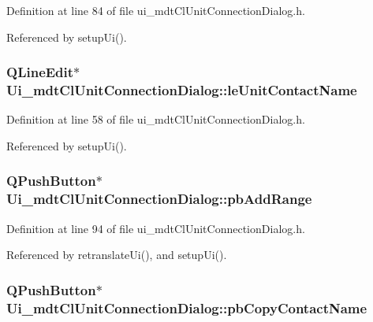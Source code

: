 Definition at line 84 of file ui\-\_\-mdt\-Cl\-Unit\-Connection\-Dialog.\-h.



Referenced by setup\-Ui().

\hypertarget{class_ui__mdt_cl_unit_connection_dialog_a62724c4b19bf950fccfc746efb4b7384}{
\subsubsection[{le\-Unit\-Contact\-Name}]{\setlength{\rightskip}{0pt plus 5cm}Q\-Line\-Edit$\ast$ Ui\-\_\-mdt\-Cl\-Unit\-Connection\-Dialog\-::le\-Unit\-Contact\-Name}}\label{class_ui__mdt_cl_unit_connection_dialog_a62724c4b19bf950fccfc746efb4b7384}


Definition at line 58 of file ui\-\_\-mdt\-Cl\-Unit\-Connection\-Dialog.\-h.



Referenced by setup\-Ui().

\hypertarget{class_ui__mdt_cl_unit_connection_dialog_ac03093f3fbb6c456fe241c362a68ee18}{
\subsubsection[{pb\-Add\-Range}]{\setlength{\rightskip}{0pt plus 5cm}Q\-Push\-Button$\ast$ Ui\-\_\-mdt\-Cl\-Unit\-Connection\-Dialog\-::pb\-Add\-Range}}\label{class_ui__mdt_cl_unit_connection_dialog_ac03093f3fbb6c456fe241c362a68ee18}


Definition at line 94 of file ui\-\_\-mdt\-Cl\-Unit\-Connection\-Dialog.\-h.



Referenced by retranslate\-Ui(), and setup\-Ui().

\hypertarget{class_ui__mdt_cl_unit_connection_dialog_aa407022db4e9256566194c987624278f}{
\subsubsection[{pb\-Copy\-Contact\-Name}]{\setlength{\rightskip}{0pt plus 5cm}Q\-Push\-Button$\ast$ Ui\-\_\-mdt\-Cl\-Unit\-Connection\-Dialog\-::pb\-Copy\-Contact\-Name}}\label{class_ui__mdt_cl_unit_connection_dialog_aa407022db4e9256566194c987624278f}


